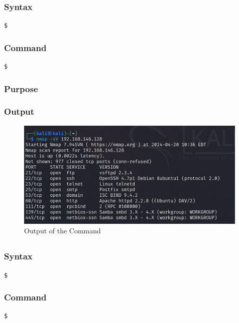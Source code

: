 \documentclass[11pt]{article}
\begin{document}
\subsubsection*{Syntax}
\begin{verbatim}
$
\end{verbatim}

\subsubsection*{Command}
\begin{verbatim}
$
\end{verbatim}

\subsubsection*{Purpose}

\subsubsection*{Output}
\begin{figure}[H]
    \centering
    \includegraphics[width=0.99\textwidth]{a3_ss (28).png}
    \caption{Output of the Command}
\end{figure}
\subsection{}

\subsubsection*{Syntax}
\begin{verbatim}
$
\end{verbatim}

\subsubsection*{Command}
\begin{verbatim}
$
\end{verbatim}
\end{document}
